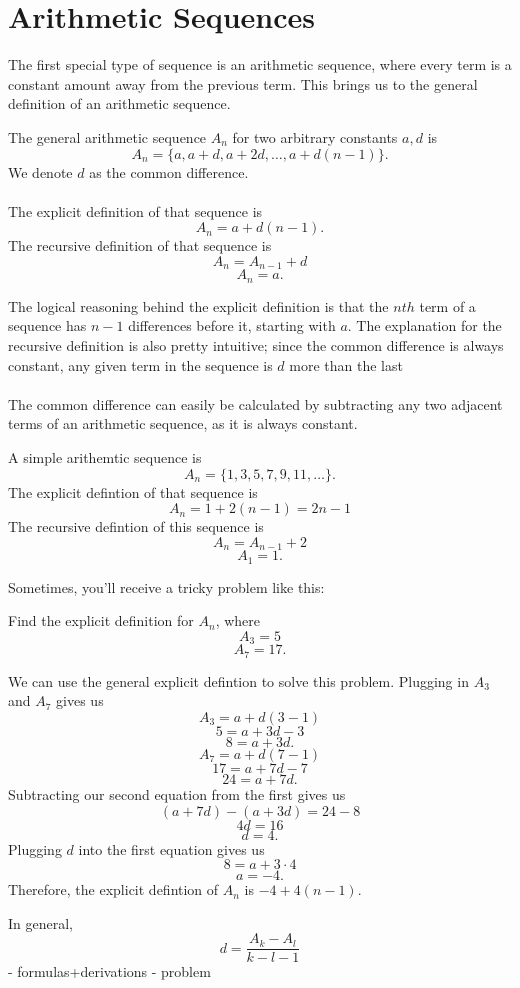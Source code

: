 \section{Arithmetic Sequences}
The first special type of sequence is an arithmetic sequence, 
where every term is a constant amount away from the previous term. This brings us to the general definition of an arithmetic sequence.
\begin{definition}
    The general arithmetic sequence $A_n$ for two arbitrary constants $a, d$ is 
    \[A_n=\{a, a+d, a+2d, \dots, a+d(n-1)\}.\]
    We denote $d$ as the common difference.\\\\
    The explicit definition of that sequence is
    \[A_n=a+d(n-1).\]
    The recursive definition of that sequence is
    \[A_n=A_{n-1}+d\]
    \[A_n=a.\]
\end{definition}
The logical reasoning behind the explicit definition is that the $nth$ term of a sequence has $n-1$ differences before it, starting with $a$. The explanation for the recursive definition is also pretty intuitive; since the common difference is always constant, any given term in the sequence is $d$ more than the last \\\\
The common difference can easily be calculated by subtracting any two adjacent terms of an arithmetic sequence, as it is always constant.
\begin{example}
    A simple arithemtic sequence is 
    \[A_n=\{1, 3, 5, 7, 9, 11,\dots\}.\]
    The explicit defintion of that sequence is 
    \[A_n=1+2(n-1)=2n-1\]
    The recursive defintion of this sequence is
    \[A_n=A_{n-1}+2\]
    \[A_1=1.\]
\end{example}
Sometimes, you'll receive a tricky problem like this:
\begin{problem}
    Find the explicit definition for $A_n$, where
    \[A_3=5\]
    \[A_7=17.\]
\end{problem}
\begin{solution}
    We can use the general explicit defintion to solve this problem. Plugging in $A_3$ and $A_7$ gives us
    \[A_3=a+d(3-1)\]
    \[5=a+3d-3\]
    \[8=a+3d.\]
    \[A_7=a+d(7-1)\]
    \[17=a+7d-7\]
    \[24=a+7d.\]
    Subtracting our second equation from the first gives us
    \[(a+7d)-(a+3d)=24-8\]
    \[4d=16\]
    \[d=4.\]
    Plugging $d$ into the first equation gives us 
    \[8=a+3\cdot4\]
    \[a=-4.\]
    Therefore, the explicit defintion of $A_n$ is $-4+4(n-1)$.
\end{solution}
In general,
\[d=\frac{A_k-A_l}{k-l-1}\]
- formulas+derivations
- problem
